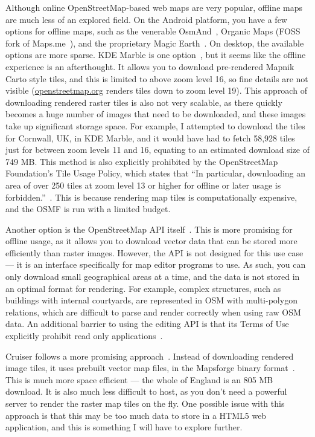 \documentclass[]{final_report}
\begin{document}
Although online OpenStreetMap-based web maps are very popular, offline maps are much less of an explored field. On the Android platform, you have a few options for offline maps, such as the venerable OsmAnd~\cite{osmand}, Organic Maps (FOSS fork of Maps.me~\cite{maps.me}), and the proprietary Magic Earth~\cite{magic-earth}. On desktop, the available options are more sparse. KDE Marble is one option~\cite{kde-marble}, but it seems like the offline experience is an afterthought. It allows you to download pre-rendered Mapnik Carto style tiles, and this is limited to above zoom level 16, so fine details are not visible (\href{https://openstreetmap.org}{openstreetmap.org} renders tiles down to zoom level 19). This approach of downloading rendered raster tiles is also not very scalable, as there quickly becomes a huge number of images that need to be downloaded, and these images take up significant storage space. For example, I attempted to download the tiles for Cornwall, UK, in KDE Marble, and it would have had to fetch 58,928 tiles just for between zoom levels 11 and 16, equating to an estimated download size of 749 MB\@. This method is also explicitly prohibited by the OpenStreetMap Foundation's Tile Usage Policy, which states that ``In particular, downloading an area of over 250 tiles at zoom level 13 or higher for offline or later usage is forbidden.''~\cite{OSMF-tile-usage-policy}. This is because rendering map tiles is computationally expensive, and the OSMF is run with a limited budget.

Another option is the OpenStreetMap API itself~\cite{osm-api-wiki}. This is more promising for offline usage, as it allows you to download vector data that can be stored more efficiently than raster images. However, the API is not designed for this use case --- it is an interface specifically for map editor programs to use. As such, you can only download small geographical areas at a time, and the data is not stored in an optimal format for rendering. For example, complex structures, such as buildings with internal courtyards, are represented in OSM with multi-polygon relations, which are difficult to parse and render correctly when using raw OSM data. An additional barrier to using the editing API is that its Terms of Use explicitly prohibit read only applications~\cite{OSM-editing-API-usage-policy}.

Cruiser follows a more promising approach~\cite{cruiser}. Instead of downloading rendered image tiles, it uses prebuilt vector map files, in the Mapsforge binary format~\cite{mapsforge-format}. This is much more space efficient --- the whole of England is an 805 MB download. It is also much less difficult to host, as you don't need a powerful server to render the raster map tiles on the fly. One possible issue with this approach is that this may be too much data to store in a HTML5 web application, and this is something I will have to explore further.
\end{document}
